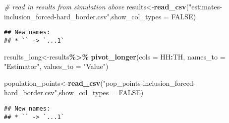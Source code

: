 \documentclass[
]{article}
\newenvironment{Shaded}{\begin{snugshade}}{\end{snugshade}}
\newcommand{\AttributeTok}[1]{\textcolor[rgb]{0.13,0.29,0.53}{#1}}
\newcommand{\CommentTok}[1]{\textcolor[rgb]{0.56,0.35,0.01}{\textit{#1}}}
\newcommand{\ConstantTok}[1]{\textcolor[rgb]{0.56,0.35,0.01}{#1}}
\newcommand{\FunctionTok}[1]{\textcolor[rgb]{0.13,0.29,0.53}{\textbf{#1}}}
\newcommand{\NormalTok}[1]{#1}
\newcommand{\OtherTok}[1]{\textcolor[rgb]{0.56,0.35,0.01}{#1}}
\newcommand{\SpecialCharTok}[1]{\textcolor[rgb]{0.81,0.36,0.00}{\textbf{#1}}}
\newcommand{\StringTok}[1]{\textcolor[rgb]{0.31,0.60,0.02}{#1}}
\begin{document}
\begin{Shaded}
\begin{Highlighting}[]
\CommentTok{\# read in results from simulation above}
\NormalTok{results}\OtherTok{\textless{}{-}}\FunctionTok{read\_csv}\NormalTok{(}\StringTok{"estimates{-}inclusion\_forced{-}hard\_border.csv"}\NormalTok{,}\AttributeTok{show\_col\_types =} \ConstantTok{FALSE}\NormalTok{)}
\end{Highlighting}
\end{Shaded}

\begin{verbatim}
## New names:
## * `` -> `...1`
\end{verbatim}

\begin{Shaded}
\begin{Highlighting}[]
\NormalTok{results\_long}\OtherTok{\textless{}{-}}\NormalTok{results}\SpecialCharTok{\%\textgreater{}\%}
  \FunctionTok{pivot\_longer}\NormalTok{(}\AttributeTok{cols =}\NormalTok{ HH}\SpecialCharTok{:}\NormalTok{TH,}
               \AttributeTok{names\_to =} \StringTok{"Estimator"}\NormalTok{, }
               \AttributeTok{values\_to =} \StringTok{"Value"}\NormalTok{)}

\NormalTok{population\_points}\OtherTok{\textless{}{-}}\FunctionTok{read\_csv}\NormalTok{(}\StringTok{"pop\_points{-}inclusion\_forced{-}hard\_border.csv"}\NormalTok{,}\AttributeTok{show\_col\_types =} \ConstantTok{FALSE}\NormalTok{)}
\end{Highlighting}
\end{Shaded}

\begin{verbatim}
## New names:
## * `` -> `...1`
\end{verbatim}
\end{document}
